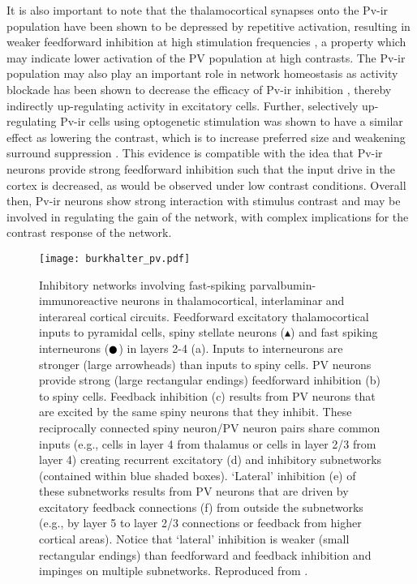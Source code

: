 It is also important to note that the thalamocortical synapses onto
the Pv-ir population have been shown to be depressed by repetitive
activation, resulting in weaker feedforward inhibition at high
stimulation frequencies \citep{Gabernet2005}, a property which may
indicate lower activation of the PV population at high contrasts. The
Pv-ir population may also play an important role in network
homeostasis as activity blockade has been shown to decrease the
efficacy of Pv-ir inhibition \citep{Bartley2008}, thereby indirectly
up-regulating activity in excitatory cells. Further, selectively
up-regulating Pv-ir cells using optogenetic stimulation was shown to
have a similar effect as lowering the contrast, which is to increase
preferred size and weakening surround suppression
\citep{Nienborg2013}. This evidence is compatible with the idea that Pv-ir
neurons provide strong feedforward inhibition such that the input
drive in the cortex is decreased, as would be observed under low
contrast conditions. Overall then, Pv-ir neurons show strong
interaction with stimulus contrast and may be involved in regulating
the gain of the network, with complex implications for the contrast
response of the network.

\begin{figure}
	\centering
        \texttt{[image: burkhalter\_pv.pdf]}
	\caption[Proposed inhibitory circuit for feedforward inhibition
      mediated by PV cells. Reproduced from
      \cite{Burkhalter2008}.]{Inhibitory networks involving
      fast-spiking parvalbumin-immunoreactive neurons in
      thalamocortical, interlaminar and interareal cortical
      circuits. Feedforward excitatory thalamocortical inputs to
      pyramidal cells, spiny stellate neurons ($\blacktriangle$) and
      fast spiking interneurons ($\newmoon$) in layers 2-4 (a). Inputs
      to interneurons are stronger (large arrowheads) than inputs to
      spiny cells. PV neurons provide strong (large rectangular
      endings) feedforward inhibition (b) to spiny cells. Feedback
      inhibition (c) results from PV neurons that are excited by the
      same spiny neurons that they inhibit. These reciprocally
      connected spiny neuron/PV neuron pairs share common inputs
      (e.g., cells in layer 4 from thalamus or cells in layer 2/3 from
      layer 4) creating recurrent excitatory (d) and inhibitory
      subnetworks (contained within blue shaded boxes). ‘Lateral’
      inhibition (e) of these subnetworks results from PV neurons that
      are driven by excitatory feedback connections (f) from outside
      the subnetworks (e.g., by layer 5 to layer 2/3 connections or
      feedback from higher cortical areas). Notice that ‘lateral’
      inhibition is weaker (small rectangular endings) than
      feedforward and feedback inhibition and impinges on multiple
      subnetworks. Reproduced from \cite{Burkhalter2008}.}
	\label{burkhalterpv}
\end{figure}

